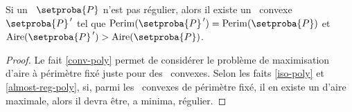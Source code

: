 

\begin{fact} \label{nece-cond}
	Si un \ngone\ $\setproba{P}$ n'est pas régulier,
	alors il existe un \ngone\ convexe $\setproba{P}^{\,\prime}$ tel que
	$\perim{\setproba{P}^{\,\prime}} = \perim{\setproba{P}}$
	et
	$\area{\setproba{P}^{\,\prime}} > \area{\setproba{P}}$.
\end{fact}


\begin{proof}
	Le fait \ref{conv-poly} permet de considérer le problème de maximisation d'aire à périmètre fixé juste pour des \ngones\ convexes.
	Selon les faits \ref{iso-poly} et \ref{almost-reg-poly}, si, parmi les \ngones\ convexes de périmètre fixé, il en existe un d'aire maximale, alors il devra être, a minima, régulier.
\end{proof}
